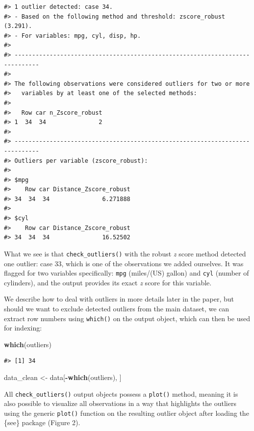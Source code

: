 \documentclass[sn-basic, lineno,pdflatex]{sn-jnl}
\newenvironment{Shaded}{\begin{snugshade}}{\end{snugshade}}
\newcommand{\FunctionTok}[1]{\textcolor[rgb]{0.13,0.29,0.53}{\textbf{#1}}}
\newcommand{\NormalTok}[1]{#1}
\newcommand{\OtherTok}[1]{\textcolor[rgb]{0.56,0.35,0.01}{#1}}
\newcommand{\SpecialCharTok}[1]{\textcolor[rgb]{0.81,0.36,0.00}{\textbf{#1}}}
\begin{document}
\begin{verbatim}
#> 1 outlier detected: case 34.
#> - Based on the following method and threshold: zscore_robust (3.291).
#> - For variables: mpg, cyl, disp, hp.
#> 
#> -----------------------------------------------------------------------------
#>  
#> The following observations were considered outliers for two or more
#>   variables by at least one of the selected methods:
#> 
#>   Row car n_Zscore_robust
#> 1  34  34               2
#> 
#> -----------------------------------------------------------------------------
#> Outliers per variable (zscore_robust): 
#> 
#> $mpg
#>    Row car Distance_Zscore_robust
#> 34  34  34               6.271888
#> 
#> $cyl
#>    Row car Distance_Zscore_robust
#> 34  34  34               16.52502
\end{verbatim}

What we see is that \texttt{check\_outliers()} with the robust \emph{z}
score method detected one outlier: case 33, which is one of the
observations we added ourselves. It was flagged for two variables
specifically: \texttt{mpg} (miles/(US) gallon) and \texttt{cyl} (number
of cylinders), and the output provides its exact \emph{z} score for this
variable.

We describe how to deal with outliers in more details later in the
paper, but should we want to exclude detected outliers from the main
dataset, we can extract row numbers using \texttt{which()} on the output
object, which can then be used for indexing:

\begin{Shaded}
\begin{Highlighting}[]
\FunctionTok{which}\NormalTok{(outliers)}
\end{Highlighting}
\end{Shaded}

\begin{verbatim}
#> [1] 34
\end{verbatim}

\begin{Shaded}
\begin{Highlighting}[]
\NormalTok{data\_clean }\OtherTok{\textless{}{-}}\NormalTok{ data[}\SpecialCharTok{{-}}\FunctionTok{which}\NormalTok{(outliers), ]}
\end{Highlighting}
\end{Shaded}

All \texttt{check\_outliers()} output objects possess a \texttt{plot()}
method, meaning it is also possible to visualize all observations in a
way that highlights the outliers using the generic \texttt{plot()}
function on the resulting outlier object after loading the \{see\}
package (Figure 2).
\end{document}
